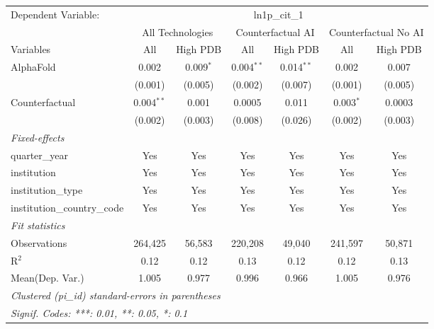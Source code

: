 \begingroup
\centering
\begin{tabular}{lcccccc}
   \tabularnewline \midrule \midrule
   Dependent Variable: & \multicolumn{6}{c}{ln1p\_cit\_1}\\
 & \multicolumn{2}{c}{All Technologies} & \multicolumn{2}{c}{Counterfactual AI} & \multicolumn{2}{c}{Counterfactual No AI} \\
\cmidrule(lr){1-1}\cmidrule(lr){2-3} \cmidrule(lr){4-5} \cmidrule(lr){6-7}
Variables & \multicolumn{1}{c}{All} & \multicolumn{1}{c}{High PDB} & \multicolumn{1}{c}{All} & \multicolumn{1}{c}{High PDB} & \multicolumn{1}{c}{All} & \multicolumn{1}{c}{High PDB} \\
\cmidrule(lr){1-1}\cmidrule(lr){2-2} \cmidrule(lr){3-3} \cmidrule(lr){4-4} \cmidrule(lr){5-5} \cmidrule(lr){6-6} \cmidrule(lr){7-7}
   AlphaFold                    & 0.002        & 0.009$^{*}$ & 0.004$^{**}$ & 0.014$^{**}$ & 0.002       & 0.007\\   
                                & (0.001)      & (0.005)     & (0.002)      & (0.007)      & (0.001)     & (0.005)\\   
   Counterfactual               & 0.004$^{**}$ & 0.001       & 0.0005       & 0.011        & 0.003$^{*}$ & 0.0003\\   
                                & (0.002)      & (0.003)     & (0.008)      & (0.026)      & (0.002)     & (0.003)\\   
   \midrule
   \emph{Fixed-effects}\\
   quarter\_year                & Yes          & Yes         & Yes          & Yes          & Yes         & Yes\\  
   institution                  & Yes          & Yes         & Yes          & Yes          & Yes         & Yes\\  
   institution\_type            & Yes          & Yes         & Yes          & Yes          & Yes         & Yes\\  
   institution\_country\_code   & Yes          & Yes         & Yes          & Yes          & Yes         & Yes\\  
   \midrule
   \emph{Fit statistics}\\
   Observations                 & 264,425      & 56,583      & 220,208      & 49,040       & 241,597     & 50,871\\  
   R$^2$                        & 0.12         & 0.12        & 0.13         & 0.12         & 0.12        & 0.13\\  
Mean(Dep. Var.) & 1.005 & 0.977 & 0.996 & 0.966 & 1.005 & 0.976 \\
   \midrule \midrule
   \multicolumn{7}{l}{\emph{Clustered (pi\_id) standard-errors in parentheses}}\\
   \multicolumn{7}{l}{\emph{Signif. Codes: ***: 0.01, **: 0.05, *: 0.1}}\\
\end{tabular}
\par\endgroup
